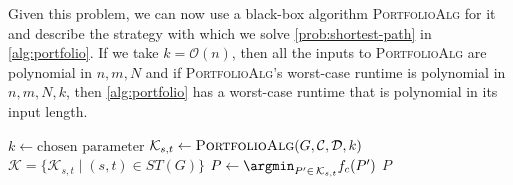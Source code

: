 Given this problem, we can now use a black-box algorithm \textsc{PortfolioAlg} for it and describe the strategy with which we solve \cref{prob:shortest-path} in \cref{alg:portfolio}. If we take $k = \mathcal O(n)$, then all the inputs to \textsc{PortfolioAlg} are polynomial in $n,m,N$ and if \textsc{PortfolioAlg}'s worst-case runtime is polynomial in $n,m,N,k$, then \cref{alg:portfolio} has a worst-case runtime that is polynomial in its input length.

\begin{algorithm}[H]
\caption{Portfolio-based algorithm for \cref{prob:shortest-path} using a black-box \textsc{PortfolioAlg} for \cref{prob:portfolio}.}
\label{alg:portfolio}
\begin{algorithmic}[1]
    \State $k \gets \text{chosen parameter}$
        \State $\mathcal K_{s,t} \gets \textsc{PortfolioAlg}(G, \mathcal C, \mathcal D, k)$
    \EndFor
    \State \Return $\mathcal K = \{\mathcal K_{s,t} \mid (s,t) \in ST(G)\}$
\EndProcedure
\Statex
{}
    \State $P \gets \argmin_{P' \in \, \mathcal K_{s,t}} f_c(P')$
    \State \Return $P$
\EndProcedure
\end{algorithmic}
\end{algorithm}
